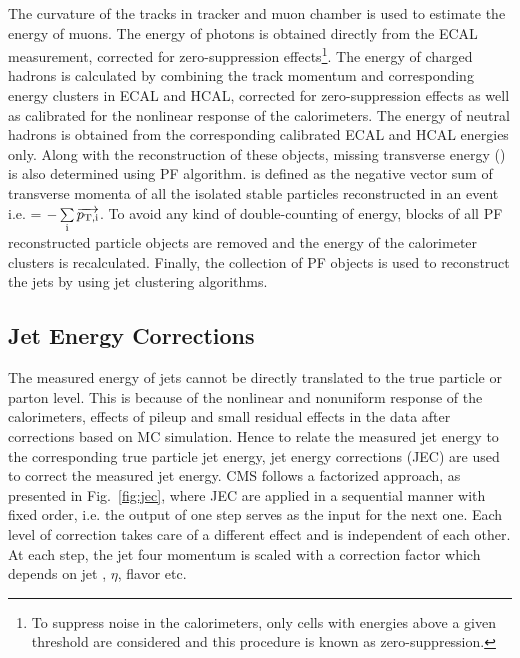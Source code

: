 The curvature of the tracks in tracker and muon chamber is used to estimate the energy of muons. The energy of photons is obtained directly from the ECAL measurement, corrected for zero-suppression effects\footnote{To suppress noise in the calorimeters, only cells with energies above a given threshold are considered and this procedure is known as zero-suppression.}. The energy of charged hadrons is calculated by combining the track momentum and corresponding energy clusters in ECAL and HCAL, corrected for zero-suppression effects as well as calibrated for the nonlinear response of the calorimeters. The energy of neutral hadrons is obtained from the corresponding calibrated ECAL and HCAL energies only. Along with the reconstruction of these objects, missing transverse energy (\ETmiss) is also determined using PF algorithm. \ETmiss is defined as the negative vector sum of transverse momenta \pt of all the isolated stable particles reconstructed in an event i.e. \ETmiss = $-\sum\limits_{\rm i}^{}\overrightarrow{p_{\rm T,i}}$. To avoid any kind of double-counting of energy, blocks of all PF reconstructed particle objects are removed and the energy of the calorimeter clusters is recalculated. Finally, the collection of PF objects is used to reconstruct the jets by using jet clustering algorithms. 

\subsection{Jet Energy Corrections}
\label{sec:jet_corrections}
The measured energy of jets cannot be directly translated to the true particle or parton level. This is because of the nonlinear and nonuniform response of the calorimeters, effects of pileup and small residual effects in the data after corrections based on MC simulation. Hence to relate the measured jet energy to the corresponding true particle jet energy, jet energy corrections (JEC) \cite{Chatrchyan:2011ds, Khachatryan:2016kdb} are used to correct the measured jet energy. CMS follows a factorized approach, as presented in Fig.~\ref{fig:jec}, where JEC are applied in a sequential manner with fixed order, i.e. the output of one step serves as the input for the next one. Each level of correction takes care of a different effect and is independent of each other. At each step, the jet four momentum is scaled with a correction factor which depends on jet \pt, $\eta$, flavor etc.

